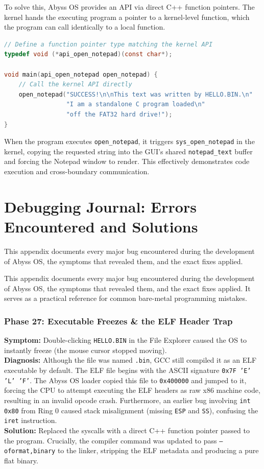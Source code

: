\documentclass[12pt,a4paper]{report}
\begin{document}
To solve this, Abyss OS provides an API via direct C++ function pointers. The kernel hands the executing program a pointer to a kernel-level function, which the program can call identically to a local function.

\begin{lstlisting}[language=C, title=programs/hello.c -- The User Program]
// Define a function pointer type matching the kernel API
typedef void (*api_open_notepad)(const char*);

void main(api_open_notepad open_notepad) {
    // Call the kernel API directly
    open_notepad("SUCCESS!\n\nThis text was written by HELLO.BIN.\n"
                 "I am a standalone C program loaded\n"
                 "off the FAT32 hard drive!");
}
\end{lstlisting}

When the program executes \texttt{open\_notepad}, it triggers \texttt{sys\_open\_notepad} in the kernel, copying the requested string into the GUI's shared \texttt{notepad\_text} buffer and forcing the Notepad window to render. This effectively demonstrates code execution and cross-boundary communication.

\newpage
\appendix

\chapter{Debugging Journal: Errors Encountered and Solutions}

This appendix documents every major bug encountered during the development of Abyss OS, the symptoms that revealed them, and the exact fixes applied.

This appendix documents every major bug encountered during the development of Abyss OS, the symptoms that revealed them, and the exact fixes applied. It serves as a practical reference for common bare-metal programming mistakes.


\subsection*{Phase 27: Executable Freezes \& the ELF Header Trap}
\textbf{Symptom:} Double-clicking \texttt{HELLO.BIN} in the File Explorer caused the OS to instantly freeze (the mouse cursor stopped moving). \\
\textbf{Diagnosis:} Although the file was named \texttt{.bin}, GCC still compiled it as an ELF executable by default. The ELF file begins with the ASCII signature \texttt{0x7F 'E' 'L' 'F'}. The Abyss OS loader copied this file to \texttt{0x400000} and jumped to it, forcing the CPU to attempt executing the ELF headers as raw x86 machine code, resulting in an invalid opcode crash. Furthermore, an earlier bug involving \texttt{int 0x80} from Ring 0 caused stack misalignment (missing \texttt{ESP} and \texttt{SS}), confusing the \texttt{iret} instruction. \\
\textbf{Solution:} Replaced the syscalls with a direct C++ function pointer passed to the program. Crucially, the compiler command was updated to pass \texttt{--oformat,binary} to the linker, stripping the ELF metadata and producing a pure flat binary.
\end{document}
